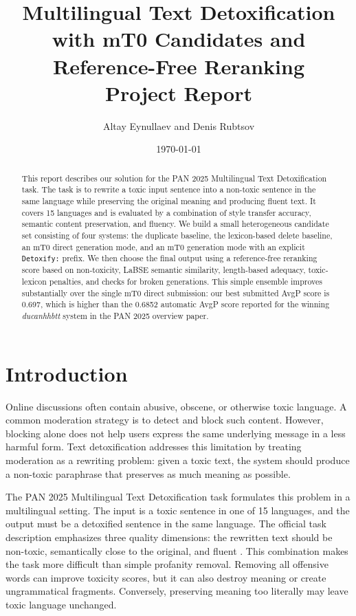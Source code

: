 \documentclass{article}
\title{Multilingual Text Detoxification with mT0 Candidates and Reference-Free Reranking\\\large Project Report}
\author{Altay Eynullaev and Denis Rubtsov}
\date{\today}
\begin{document}
\maketitle

\begin{abstract}
This report describes our solution for the PAN 2025 Multilingual Text Detoxification task. The task is to rewrite a toxic input sentence into a non-toxic sentence in the same language while preserving the original meaning and producing fluent text. It covers 15 languages and is evaluated by a combination of style transfer accuracy, semantic content preservation, and fluency. We build a small heterogeneous candidate set consisting of four systems: the duplicate baseline, the lexicon-based delete baseline, an mT0 direct generation mode, and an mT0 generation mode with an explicit \texttt{Detoxify:} prefix. We then choose the final output using a reference-free reranking score based on non-toxicity, LaBSE semantic similarity, length-based adequacy, toxic-lexicon penalties, and checks for broken generations. This simple ensemble improves substantially over the single mT0 direct submission: our best submitted AvgP score is 0.697, which is higher than the 0.6852 automatic AvgP score reported for the winning \textit{ducanhhbtt} system in the PAN 2025 overview paper.
\end{abstract}

\section{Introduction}

Online discussions often contain abusive, obscene, or otherwise toxic language. A common moderation strategy is to detect and block such content. However, blocking alone does not help users express the same underlying message in a less harmful form. Text detoxification addresses this limitation by treating moderation as a rewriting problem: given a toxic text, the system should produce a non-toxic paraphrase that preserves as much meaning as possible.

The PAN 2025 Multilingual Text Detoxification task formulates this problem in a multilingual setting. The input is a toxic sentence in one of 15 languages, and the output must be a detoxified sentence in the same language. The official task description emphasizes three quality dimensions: the rewritten text should be non-toxic, semantically close to the original, and fluent \cite{pan25taskpage,dementieva2025pantextdetox}. This combination makes the task more difficult than simple profanity removal. Removing all offensive words can improve toxicity scores, but it can also destroy meaning or create ungrammatical fragments. Conversely, preserving meaning too literally may leave toxic language unchanged.
\end{document}
